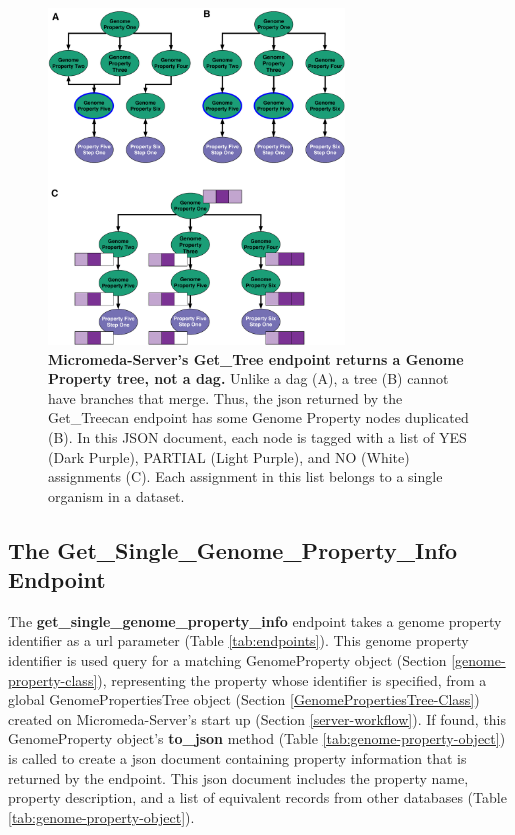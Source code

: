 \begin{figure}[!ht]
  \centering
	\includegraphics[width=0.70\textwidth]{media/Tree-JSON.pdf}
	 \caption[Micromeda-Server's Get\_Tree endpoint returns a Genome Property tree, not a DAG.]{\textbf{Micromeda-Server's Get\_Tree endpoint returns a Genome Property tree, not a \gls{dag}.} Unlike a \gls{dag} (A), a tree (B) cannot have branches that merge. Thus, the \gls{json} returned by the Get\_Treecan endpoint has some Genome Property nodes duplicated (B). In this JSON document, each node is tagged with a list of YES (Dark Purple), PARTIAL (Light Purple), and NO (White) assignments (C). Each assignment in this list belongs to a single organism in a dataset.}
	 \label{fig:tree-json}
\end{figure}

\subsection{The Get\_Single\_Genome\_Property\_Info Endpoint} \label{get-property-info-endpoint}

The \textbf{get\_single\_genome\_property\_info} endpoint takes a genome property identifier as a \gls{url} parameter (Table \ref{tab:endpoints}). This genome property identifier is used query for a matching GenomeProperty object (Section \ref{genome-property-class}), representing the property whose identifier is specified, from a global GenomePropertiesTree object (Section \ref{GenomePropertiesTree-Class}) created on Micromeda-Server's start up (Section \ref{server-workflow}). If found, this GenomeProperty object's \textbf{to\_json} method (Table \ref{tab:genome-property-object}) is called to create a \gls{json} document containing property information that is returned by the endpoint. This \gls{json} document includes the property name, property description, and a list of equivalent records from other databases (Table \ref{tab:genome-property-object}).

